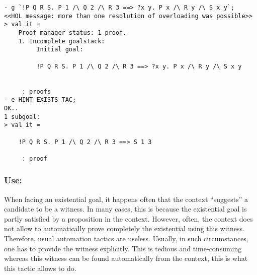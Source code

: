 \documentclass{llncs}
\begin{document}
    \begin{example}
      \begin{verbatim}
- g `!P Q R S. P 1 /\ Q 2 /\ R 3 ==> ?x y. P x /\ R y /\ S x y`;
<<HOL message: more than one resolution of overloading was possible>>
> val it =
    Proof manager status: 1 proof.
    1. Incomplete goalstack:
         Initial goal:
    
         !P Q R S. P 1 /\ Q 2 /\ R 3 ==> ?x y. P x /\ R y /\ S x y
    
    
     : proofs
- e HINT_EXISTS_TAC;
OK..
1 subgoal:
> val it =
    
    !P Q R S. P 1 /\ Q 2 /\ R 3 ==> S 1 3
    
     : proof\end{verbatim}
    \end{example}

    \subsubsection{Use:} When facing an existential goal, it happens often that the context
    ``suggests'' a candidate to be a witness.
    In many cases, this is because the existential goal is partly satisfied by a proposition
    in the context.
    However, often, the context does not allow to automatically prove completely
    the existential using this witness. Therefore, usual automation tactics are useless.
    Usually, in such circumstances, one has to provide the witness explicitly.
    This is tedious and time-consuming whereas this witness can be found automatically from the context,
    this is what this tactic allows to do.
\end{document}
